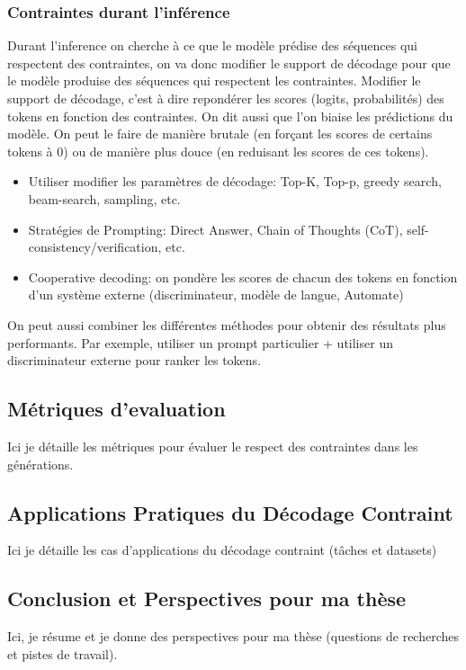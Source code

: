 \subsubsection{Contraintes durant l'inférence}\label{contraintes-durant-linfuxe9rence}

Durant l'inference on cherche à ce que le modèle prédise des séquences
qui respectent des contraintes, on va donc modifier le support de
décodage pour que le modèle produise des séquences qui respectent les
contraintes. Modifier le support de décodage, c'est à dire repondérer
les scores (logits, probabilités) des tokens en fonction des
contraintes. On dit aussi que l'on biaise les prédictions du modèle. On
peut le faire de manière brutale (en forçant les scores de certains
tokens à 0) ou de manière plus douce (en reduisant les scores de ces
tokens).

\begin{itemize}
\tightlist
\item
  Utiliser modifier les paramètres de décodage: Top-K, Top-p, greedy
  search, beam-search, sampling, etc.
\item
  Stratégies de Prompting: Direct Answer, Chain of Thoughts (CoT),
  self-consistency/verification, etc.
\item
  Cooperative decoding: on pondère les scores de chacun des tokens en
  fonction d'un système externe (discriminateur, modèle de langue,
  Automate)
\end{itemize}

On peut aussi combiner les différentes méthodes pour obtenir des
résultats plus performants. Par exemple, utiliser un prompt particulier
+ utiliser un discriminateur externe pour ranker les tokens.

\subsection{Métriques d'evaluation}\label{muxe9triques-devaluation}

Ici je détaille les métriques pour évaluer le respect des contraintes
dans les générations.

\subsection{Applications Pratiques du Décodage Contraint}\label{applications-pratiques-du-duxe9codage-contraint}

Ici je détaille les cas d'applications du décodage contraint (tâches et
datasets)

\subsection{Conclusion et Perspectives pour ma thèse}\label{conclusion-et-perspectives-pour-ma-thuxe8se}

Ici, je résume et je donne des perspectives pour ma thèse (questions de
recherches et pistes de travail).



